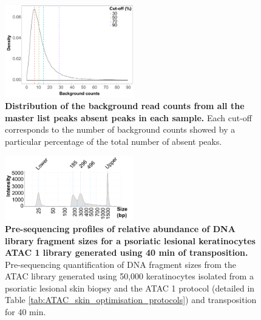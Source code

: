 \begin{figure}[htbp]
\centering
\includegraphics[width=0.5\textwidth]{./Appendix/pdfs/Chapter3/ATAC_absent_peaks_noise_distribution}
\caption[Distribution of the background read counts from all the master list peaks absent in each sample.]{\textbf{Distribution of the background read counts from all the master list peaks absent peaks in each sample.} Each cut-off corresponds to the number of background counts showed by a particular percentage of the total number of absent peaks.}
\label{figure:ATAC_absent_peaks_distribution}
\end{figure}


\begin{figure}[htbp]
\centering
\includegraphics[width=0.5\textwidth]{./Appendix/pdfs/Chapter3/ATAC_PS02_tapestation_40min}
\caption[Pre-sequencing profiles of relative abundance of DNA library fragment sizes for a psoriatic lesional keratinocytes ATAC 1 library generated using 40 min of transposition.]{\textbf{Pre-sequencing profiles of relative abundance of DNA library fragment sizes for a psoriatic lesional keratinocytes ATAC 1 library generated using 40 min of transposition.} Pre-sequencing quantification of DNA fragment sizes from the ATAC library generated using 50,000 keratinocytes isolated from a psoriatic lesional skin biopsy and the ATAC 1 protocol (detailed in Table \ref{tab:ATAC_skin_optimisation_protocols}) and transposition for 40 min.}
\label{figure:PS2_40min_tapestation}
\end{figure}



